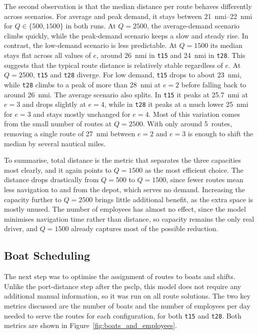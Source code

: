 \documentclass[12pt]{article}
\begin{document}
The second observation is that the median distance per route behaves differently across scenarios. For average and peak demand, it stays between \qtyrange{21}{22}{nmi} for \(Q \in \{500, 1500\}\) in both runs. At \(Q=2500\), the average-demand scenario climbs quickly, while the peak-demand scenario keeps a slow and steady rise. In contrast, the low-demand scenario is less predictable. At \(Q=1500\) its median stays flat across all values of \(e\), around \qty{26}{nmi} in \texttt{t15} and \qty{24}{nmi} in \texttt{t28}. This suggests that the typical route distance is relatively stable regardless of \(e\). At \(Q=2500\), \texttt{t15} and \texttt{t28} diverge. For low demand, \texttt{t15} drops to about \qty{23}{nmi}, while \texttt{t28} climbs to a peak of more than \qty{28}{nmi} at \(e=2\) before falling back to around \qty{26}{nmi}. The average scenario also splits. In \texttt{t15} it peaks at \qty{25.7}{nmi} at \(e=3\) and drops slightly at \(e=4\), while in \texttt{t28} it peaks at a much lower \qty{25}{nmi} for \(e=3\) and stays mostly unchanged for \(e=4\). Most of this variation comes from the small number of routes at \(Q=2500\). With only around \qty{5}{routes}, removing a single route of \qty{27}{nmi} between \(e=2\) and \(e=3\) is enough to shift the median by several nautical miles.

To summarise, total distance is the metric that separates the three capacities most clearly, and it again points to \(Q=1500\) as the most efficient choice. The distance drops drastically from \(Q=500\) to \(Q=1500\), since fewer routes mean less navigation to and from the depot, which serves no demand. Increasing the capacity further to \(Q=2500\) brings little additional benefit, as the extra space is mostly unused. The number of employees has almost no effect, since the model minimises navigation time rather than distance, so capacity remains the only real driver, and \(Q=1500\) already captures most of the possible reduction.

\subsection{Boat Scheduling}
\label{subsec:boat-scheduling}

The next step was to optimise the assignment of routes to boats and shifts. Unlike the port-distance step after the \ac{psclp}, this model does not require any additional manual information, so it was run on all route solutions. The two key metrics discussed are the number of boats and the number of employees per day needed to serve the routes for each configuration, for both \texttt{t15} and \texttt{t28}. Both metrics are shown in Figure~\ref{fig:boats_and_employees}.
\end{document}
